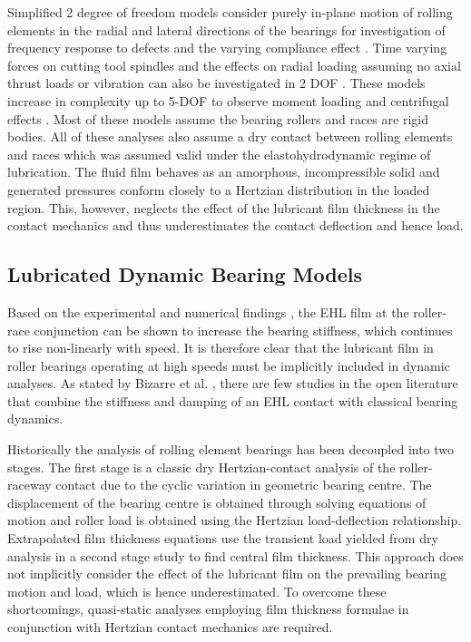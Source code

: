 Simplified 2 degree of freedom models \cite{Walters1971} consider purely in-plane motion of rolling elements in the radial and lateral directions of the bearings for investigation of frequency response to defects \cite{Meyer1980} and the varying compliance effect \cite{Sunnersjo1978}.  Time varying forces on cutting tool spindles and the effects on radial loading assuming no axial thrust loads or vibration can also be investigated in 2 DOF \cite{Matsubara1988}. These models increase in complexity up to 5-DOF  to observe moment loading and centrifugal effects \cite{Gupta1979} \cite{Aini1990} \cite{Rahnejat2004}. Most of these models assume the bearing rollers and races are rigid bodies. All of these analyses also assume a dry contact between rolling elements and races which was assumed valid under the elastohydrodynamic regime of lubrication. The fluid film behaves as an amorphous, incompressible solid and generated pressures conform closely to a Hertzian distribution in the loaded region. This, however, neglects the effect of the lubricant film thickness in the contact mechanics and thus underestimates the contact deflection and hence load.

\subsection{Lubricated Dynamic Bearing Models}

Based on the experimental and numerical findings \cite{Questa2020} \cite{Stone1982} \cite{Dietl1997}, the EHL film at the roller-race conjunction can be shown to increase the bearing stiffness, which continues to rise non-linearly with speed. It is therefore clear that the lubricant film in roller bearings operating at high speeds must be implicitly included in dynamic analyses. As stated by Bizarre et al. \cite{Bizarre2018}, there are few studies in the open literature that combine the stiffness and damping of an EHL contact with classical bearing dynamics.

Historically the analysis of rolling element bearings has been decoupled into two stages. The first stage is a classic dry Hertzian-contact analysis of the roller-raceway contact due to the cyclic variation in geometric bearing centre.  The displacement of the bearing centre is obtained through solving equations of motion and roller load is obtained using the Hertzian load-deflection relationship. Extrapolated film thickness equations use the transient load yielded from dry analysis in a second stage study to find central film thickness. This approach does not implicitly consider the effect of the lubricant film on the prevailing bearing motion and load, which is hence underestimated. To overcome these shortcomings, quasi-static analyses employing film thickness formulae in conjunction with Hertzian contact mechanics are required.

